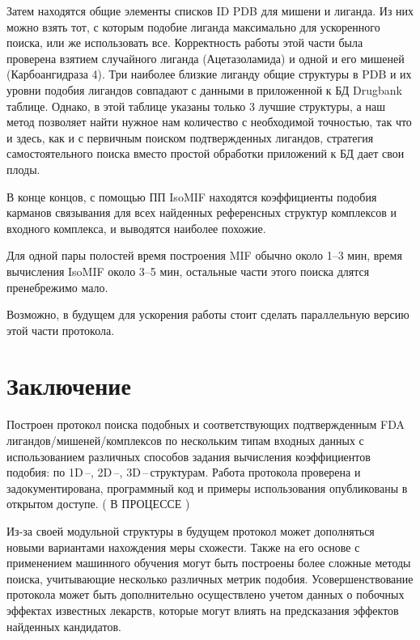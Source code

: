 \documentclass[a4paper,14pt]{article}         %
\newcommand{\sic}[1]{\LARGE\color{orange}{#1}\color{black}\Large}
\begin{document}
Затем находятся общие элементы списков ID PDB для мишени и лиганда. Из них можно взять тот, с которым подобие лиганда максимально для ускоренного поиска, или же использовать все. Корректность работы этой части была проверена взятием случайного лиганда (Ацетазоламида) и одной и его мишеней (Карбоангидраза 4). Три наиболее близкие лиганду общие структуры в PDB и их уровни подобия лигандов совпадают с данными в приложенной к БД Drugbank таблице. Однако, в этой таблице указаны только 3 лучшие структуры, а наш метод позволяет найти нужное нам количество с необходимой точностью, так что и здесь, как и с первичным поиском подтвержденных лигандов, стратегия самостоятельного поиска вместо простой обработки приложений к БД дает свои плоды.

В конце концов, с помощью ПП IsoMIF находятся коэффициенты подобия карманов связывания для всех найденных референсных структур комплексов и входного комплекса, и выводятся наиболее похожие.

\sic{ПРИМЕР}

Для одной пары полостей время построения MIF обычно около 1--3 мин, время вычисления IsoMIF около 3--5 мин, остальные части этого поиска длятся пренебрежимо мало.

Возможно, в будущем для ускорения работы стоит сделать параллельную версию этой части протокола.

\newpage
\section{Заключение}
Построен протокол поиска подобных и соответствующих подтвержденным FDA лигандов/мишеней/комплексов по нескольким типам входных данных с использованием различных способов задания вычисления коэффициентов подобия: по 1D\,--, 2D\,--, 3D\,--\,структурам. Работа протокола проверена и задокументирована, программный код и примеры использования опубликованы в открытом доступе. (\color{orange} В ПРОЦЕССЕ \color{black})

Из-за своей модульной структуры в будущем протокол может дополняться новыми вариантами нахождения меры схожести. Также на его основе с применением машинного обучения могут быть построены более сложные методы поиска, учитывающие несколько различных метрик подобия. Усовершенствование протокола может быть дополнительно осуществлено учетом данных о побочных эффектах известных лекарств, которые могут влиять на предсказания эффектов найденных кандидатов.


\newpage
\printbibliography[heading=bibintoc, title=Список использованных источников]
\end{document}
